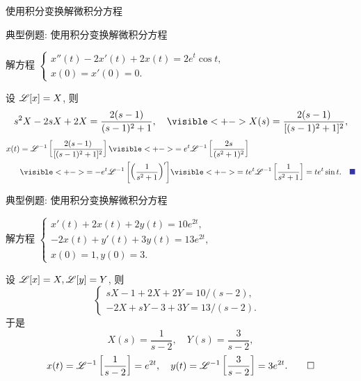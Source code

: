 \begin{frame}{使用积分变换解微积分方程}
\begin{center}
\end{center}
\end{frame}


\begin{frame}{典型例题: 使用积分变换解微积分方程}
\beqskip{8pt}
\begin{example}
解方程 
  $\begin{cases}
    x''(t)-2x'(t)+2x(t)=2e^t\cos t,&\\
    x(0)=x'(0)=0.&
  \end{cases}$
\end{example}
\begin{solutions}
设 $\mathscr{L}[x]=X$, 则
\[s^2X-2sX+2X=\frac{2(s-1)}{(s-1)^2+1},\quad
\visible<+->{X(s)=\frac{2(s-1)}{[(s-1)^2+1]^2},}\]
\onslide<+->
\vspace{-\baselineskip}
\begin{align*}
x(t)&=\msl^{-1}\left[\frac{2(s-1)}{[(s-1)^2+1]^2}\right]
\visible<+->{=e^t\msl^{-1}\left[\frac{2s}{(s^2+1)^2}\right]}\\
&\visible<+->{=-e^t\msl^{-1}\left[\left(\frac1{s^2+1}\right)'\right]}
\visible<+->{=te^t\msl^{-1}\left[\frac1{s^2+1}\right]=te^t\sin t.\mqed}
\end{align*}
\end{solutions}
\endgroup
\end{frame}


\begin{frame}{典型例题: 使用积分变换解微积分方程}
\beqskip{0pt}
\begin{example}
解方程 
  $\begin{cases}
    x'(t)+2x(t)+2y(t)=10e^{2t},&\\
    -2x(t)+y'(t)+3y(t)=13e^{2t},&\\
    x(0)=1,y(0)=3.&
  \end{cases}$
\end{example}
\vspace{-7pt}
\begin{solution}
设 $\mathscr{L}[x]=X,\mathscr{L}[y]=Y$, 则
  \[\begin{cases}
    sX-1+2X+2Y=10/(s-2),&\\
    -2X+sY-3+3Y=13/(s-2).&
  \end{cases}\]
\onslide<+->
于是
\[X(s)=\frac1{s-2},\quad Y(s)=\frac3{s-2},\]
\onslide<+->
\[x(t)=\mathscr{L}^{-1}\left[\frac1{s-2}\right]=e^{2t},\quad
y(t)=\mathscr{L}^{-1}\left[\frac3{s-2}\right]=3e^{2t}.\qedhere\]
\end{solution}
\endgroup
\end{frame}


